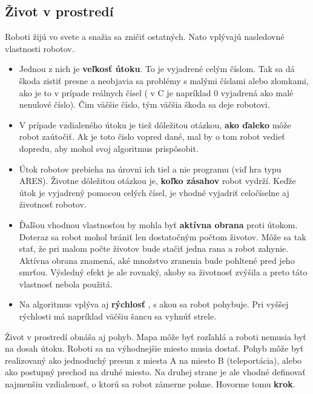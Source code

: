 \subsection{Život v prostredí} %
Roboti žijú vo svete a snažia sa zničiť ostatných. Nato vplývajú nasledovné vlastnosti robotov. \\
\begin{itemize}
\item Jednou z nich je {\bf veľkosť útoku}. To je vyjadrené celým číslom. Tak sa dá škoda zistiť presne a neobjavia sa problémy s malými číslami alebo zlomkami, ako je to v prípade reálnych čísel ( v C je napríklad 0 vyjadrená ako malé nenulové číslo). Čim väčšie číslo, tým väčšia škoda sa deje robotovi. 
\item V prípade vzdialeného útoku je tiež dôležitou otázkou, {\bf ako ďaleko } môže robot zaútočiť. Ak je toto čislo vopred dané, mal by o tom robot vedieť dopredu, aby mohol svoj algoritmus prispôsobit.
\item Útok robotov prebieha na úrovni ich tiel a nie programu (viď hra typu ARES). Životne dôležitou otázkou je, {\bf koľko zásahov} robot vydrží. Keďže útok je vyjadrený pomocou celých čísel, je vhodné vyjadriť celočíselne aj životnosť robotov.\\
\item Ďaľšou vhodnou vlastnosťou by mohla byť {\bf aktívna obrana } proti útokom. Doteraz sa robot mohol brániť len dostatočným počtom životov. Môže sa tak stať, že pri malom počte životov bude stačiť jedna rana a robot zahynie. Aktívna obrana znamená, aké množstvo zranenia bude pohltené pred jeho smrťou. Výsledný efekt je ale rovnaký, akoby sa životnosť zvýšila a preto táto vlastnosť nebola použitá. \\ 
\item Na algoritmus vplýva aj {\bf rýchlosť }, s akou sa robot pohybuje. Pri vyššej rýchlosti má napríklad väčšiu šancu sa vyhnúť strele.\\
\end{itemize}
Život v prostredí obnáša aj pohyb. Mapa môže byť rozľahlá a roboti nemusia byť na dosah útoku. Roboti sa na výhodnejšie miesto musia dostať. Pohyb môže byť realizovaný ako jednoduchý presun z miesta A na miesto B (teleportácia), alebo ako postupný prechod na druhé miesto. Na druhej strane je ale vhodné definovať najmenšiu vzdialenosť, o ktorú sa robot zámerne pohne. Hovorme tomu {\bf krok}.\\ %
